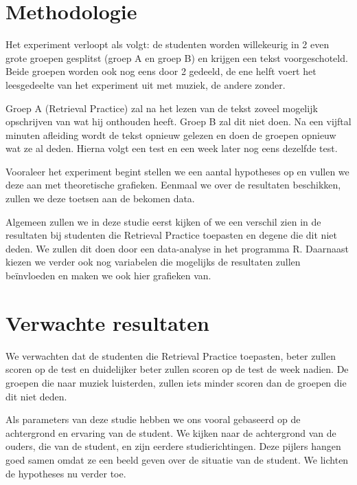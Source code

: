 \documentclass{voorstel}
\begin{document}
	
	\section{Methodologie}
	\label{sec:methodologie}
	
	Het experiment verloopt als volgt: de studenten worden willekeurig in 2 even grote groepen gesplitst (groep A en groep B) en krijgen een tekst voorgeschoteld. Beide groepen worden ook nog eens door 2 gedeeld, de ene helft voert het leesgedeelte van het experiment uit met muziek, de andere zonder.
    
    Groep A (Retrieval Practice) zal na het lezen van de tekst zoveel mogelijk opschrijven van wat hij onthouden heeft. Groep B zal dit niet doen. 
    Na een vijftal minuten afleiding wordt de tekst opnieuw gelezen en doen de groepen opnieuw wat ze al deden.
    Hierna volgt een test en een week later nog eens dezelfde test.
    
    Vooraleer het experiment begint stellen we een aantal hypotheses op en vullen we deze aan met theoretische grafieken. Eenmaal we over de resultaten beschikken, zullen we deze toetsen aan de bekomen data.
    
 Algemeen zullen we in deze studie eerst kijken of we een verschil zien in de resultaten bij studenten die Retrieval Practice toepasten en degene die dit niet deden. We zullen dit doen door een data-analyse in het programma R. Daarnaast kiezen we verder ook nog variabelen die mogelijks de resultaten zullen beïnvloeden en maken we ook hier grafieken van.
	
	\section{Verwachte resultaten}
	\label{sec:verwachte_resultaten}
    We verwachten dat de studenten die Retrieval Practice toepasten, beter zullen scoren op de test en duidelijker beter zullen scoren op de test de week nadien. De groepen die naar muziek luisterden, zullen iets minder scoren dan de groepen die dit niet deden.
    
	Als parameters van deze studie hebben we ons vooral gebaseerd op de achtergrond en ervaring van de student. We kijken naar de achtergrond van de ouders, die van de student, en zijn eerdere studierichtingen. Deze pijlers hangen goed samen omdat ze een beeld geven over de situatie van de student. We lichten de hypotheses nu verder toe.
    
\end{document}
